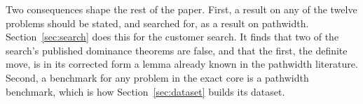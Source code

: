 Two consequences shape the rest of the paper. First, a result on any of the
twelve problems should be stated, and searched for, as a result on pathwidth.
Section~\ref{sec:search} does this for the customer search. It finds that two of the search's published dominance theorems are false, and that the first, the definite move, is in its corrected form a lemma already known in the pathwidth literature.
Second, a benchmark for any problem in the exact core is a pathwidth benchmark,
which is how Section~\ref{sec:dataset} builds its dataset.
